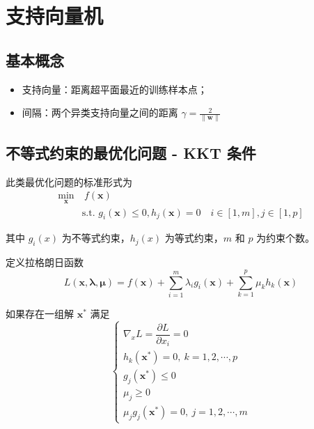 \section{支持向量机}
\subsection{基本概念}
\begin{itemize}
    \item 支持向量：距离超平面最近的训练样本点；
    \item 间隔：两个异类支持向量之间的距离 $\gamma = \frac 2{\|\boldsymbol{w}\|}$
\end{itemize}

\subsection{不等式约束的最优化问题 - KKT 条件}
此类最优化问题的标准形式为
\begin{equation}
    \begin{aligned}
        \min_{\boldsymbol{x}}&\  f(\boldsymbol{x}) \\
        & \text{s.t. } g_i(\boldsymbol{x}) \leq 0, h_j(\boldsymbol{x}) = 0\quad i \in [1, m], j \in [1, p]
        \end{aligned}
\end{equation}

其中 $g_i(x)$ 为不等式约束，$h_j(x)$ 为等式约束，$m$ 和 $p$ 为约束个数。

定义拉格朗日函数
\begin{equation}
    L(\boldsymbol{x}, \boldsymbol{\lambda}, \boldsymbol{\mu}) 
    = f(\boldsymbol x) + \sum_{i=1}^m \lambda_i g_i(\boldsymbol x) + \sum_{k=1}^p \mu_k h_k(\boldsymbol x)
\end{equation}

如果存在一组解 $\boldsymbol{x}^*$ 满足
\begin{equation}
    \begin{cases}
        \nabla_x L = \dfrac{\partial L}{\partial x_i} = 0 \\
        h_k(\boldsymbol x^*) = 0,\ k = 1, 2, \cdots, p \\
        g_j(\boldsymbol x^*) \leq 0 \\
        \mu_j \geq 0 \\
        \mu_j g_j(\boldsymbol x^*) = 0,\ j = 1, 2, \cdots, m
        \end{cases}
\end{equation}

